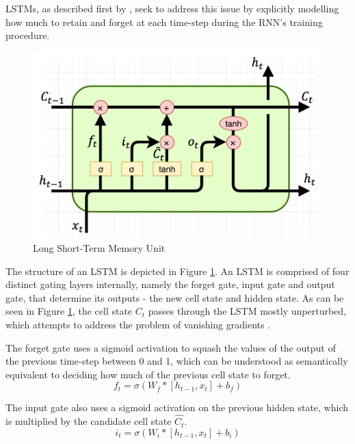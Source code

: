 LSTMs, as described first by \cite{hochreiter1997long}, seek to address this issue by explicitly modelling how much to retain and forget at each time-step during the RNN's training procedure.

\begin{figure}[ht]
	\centering
	\includegraphics[width=\textwidth]{images/lstm}
	\caption{\label{fig:lstm} Long Short-Term Memory Unit}
\end{figure}

The structure of an LSTM is depicted in Figure \ref{fig:lstm}. An LSTM is comprised of four distinct gating layers internally, namely the forget gate, input gate and output gate, that determine its outputs - the new cell state and hidden state. As can be seen in Figure \ref{fig:lstm}, the cell state $C_t$ passes through the LSTM mostly unperturbed, which attempts to address the problem of vanishing gradients \citep{hochreiter1999vanishing}.

The forget gate uses a sigmoid activation to squash the values of the output of the previous time-step between 0 and 1, which can be understood as semantically equivalent to deciding how much of the previous cell state to forget.
\begin{equation*}
	f_t = \sigma(W_f*[h_{t-1}, x_t] + b_f)
\end{equation*}

The input gate also uses a sigmoid activation on the previous hidden state, which is multiplied by the candidate cell state $\hat{C_t}$.
\begin{equation*}
	i_t = \sigma(W_i*[h_{t-1}, x_t] + b_i)
\end{equation*}

